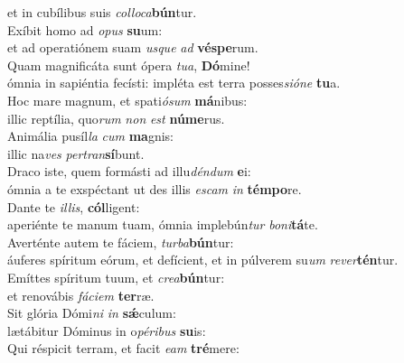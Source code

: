 \oddverse et in cubílibus suis \textit{col}\textit{lo}\textit{ca}\textbf{bún}tur.\\
\evenverse Exíbit homo ad \textit{o}\textit{pus} \textbf{su}um:~\*\\
\evenverse et ad operatiónem suam \textit{us}\textit{que} \textit{ad} \textbf{vé}\textbf{spe}rum.\\
\oddverse Quam magnificáta sunt ópera \textit{tu}\textit{a}, \textbf{Dó}mine!~\*\\
\oddverse ómnia in sapiéntia fecísti: impléta est terra posses\textit{si}\textit{ó}\textit{ne} \textbf{tu}a.\\
\evenverse Hoc mare magnum, et spati\textit{ó}\textit{sum} \textbf{má}nibus:~\*\\
\evenverse illic reptília, quo\textit{rum} \textit{non} \textit{est} \textbf{nú}\textbf{me}rus.\\
\oddverse Animália pusíl\textit{la} \textit{cum} \textbf{ma}gnis:~\*\\
\oddverse illic na\textit{ves} \textit{per}\textit{tran}\textbf{sí}bunt.\\
\evenverse Draco iste, quem formásti ad illu\textit{dén}\textit{dum} \textbf{e}i:~\*\\
\evenverse ómnia a te exspéctant ut des illis \textit{e}\textit{scam} \textit{in} \textbf{tém}\textbf{po}re.\\
\oddverse Dante te \textit{il}\textit{lis}, \textbf{cól}ligent:~\*\\
\oddverse aperiénte te manum tuam, ómnia implebún\textit{tur} \textit{bo}\textit{ni}\textbf{tá}te.\\
\evenverse Averténte autem te fáciem, \textit{tur}\textit{ba}\textbf{bún}tur:~\*\\
\evenverse áuferes spíritum eórum, et defícient, et in púlverem su\textit{um} \textit{re}\textit{ver}\textbf{tén}tur.\\
\oddverse Emíttes spíritum tuum, et \textit{cre}\textit{a}\textbf{bún}tur:~\*\\
\oddverse et renovábis \textit{fá}\textit{ci}\textit{em} \textbf{ter}ræ.\\
\evenverse Sit glória Dómi\textit{ni} \textit{in} \textbf{sǽ}culum:~\*\\
\evenverse lætábitur Dóminus in o\textit{pé}\textit{ri}\textit{bus} \textbf{su}is:\\
\oddverse Qui réspicit terram, et facit \textit{e}\textit{am} \textbf{tré}mere:~\*\\
